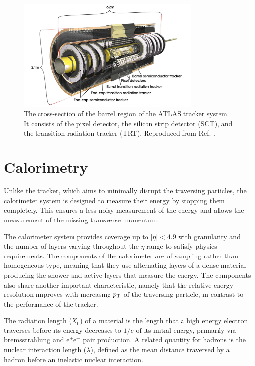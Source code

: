 \begin{figure}[h]
  \centering
  \includegraphics[width=0.8\textwidth]{figures/experiment/tracker}
  \caption[The ATLAS tracker]{The cross-section of the barrel region
  of the ATLAS tracker system. It consists of the pixel detector,
  the silicon strip detector (SCT), and the transition-radiation
  tracker (TRT).
  Reproduced from Ref. \cite{Potamianos:2016ptf}.}
   \label{fig:exp:tracker}
\end{figure}

\section{Calorimetry}

Unlike the tracker, which aims to minimally disrupt the traversing
particles, the calorimeter system is designed to measure their
energy by stopping them completely. This ensures a less
noisy measurement of the energy and allows the measurement of
the missing transverse momentum.

The calorimeter system provides coverage
up to $|\eta| < 4.9$ with granularity and the number of layers varying
throughout the $\eta$ range to satisfy physics requirements. The
components of the calorimeter are of sampling rather than homogeneous
type, meaning that they use alternating layers of a dense material
producing the shower and active layers that measure the energy. The
components also share another important characteristic, namely that
the relative energy resolution improves with increasing $p_{\text{T}}$ of
the traversing particle, in contrast to the performance of the
tracker.

The radiation length ($X_0$) of a material is the length that a high
energy electron traverses before its energy decreases to $1/e$ of
its initial energy, primarily via bremsstrahlung and e$^+$e$^-$
pair production. A related quantity for hadrons is the nuclear
interaction length ($\lambda$), defined as the mean distance traversed by a
hadron before an inelastic nuclear interaction. 

